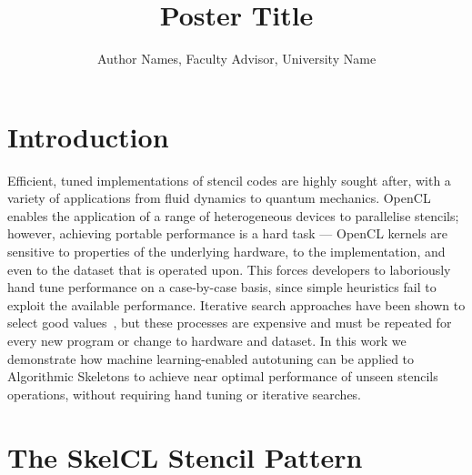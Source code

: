 \documentclass[times, 10pt,twocolumn]{article}
\begin{document}
\title{
\vspace{-0.8in}
Poster Title
\vspace{-0.2in}
}
\author{Author Names, Faculty Advisor, University Name
}

\maketitle
\thispagestyle{empty}

\section{Introduction}
\label{intro}

Efficient, tuned implementations of stencil codes are highly sought
after, with a variety of applications from fluid dynamics to quantum
mechanics. OpenCL enables the application of a range of heterogeneous
devices to parallelise stencils; however, achieving portable
performance is a hard task --- OpenCL kernels are sensitive to
properties of the underlying hardware, to the implementation, and even
to the dataset that is operated upon. This forces developers to
laboriously hand tune performance on a case-by-case basis, since
simple heuristics fail to exploit the available performance. Iterative
search approaches have been shown to select good
values~\cite{Nugteren2015,Ansel2013,Zhang2013a}, but these processes
are expensive and must be repeated for every new program or change to
hardware and dataset. In this work we demonstrate how machine
learning-enabled autotuning can be applied to Algorithmic Skeletons to
achieve near optimal performance of unseen stencils operations,
without requiring hand tuning or iterative searches.

\section{The SkelCL Stencil Pattern}

\end{document}
